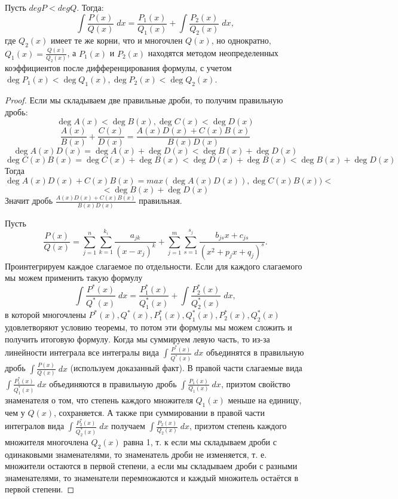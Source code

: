 	\begin{theorem}
		Пусть $deg P < deg Q$. Тогда:
		\[ \int \frac{P(x)}{Q(x)} \; dx = \frac{P_1(x)}{Q_1(x)} + \int \frac{P_2(x)}{Q_2(x)} \; dx,\]
		где $Q_2(x)$ имеет те же корни, что и многочлен $Q(x)$, но
		однократно, $Q_1(x) = \frac{Q(x)}{Q_2(x)}$, а $P_1(x)$ и $P_2(x)$ находятся методом неопределенных коэффициентов после дифференцирования формулы, с учетом $\deg{P_1(x)} < \deg{Q_1(x)}, \deg{P_2(x)} < \deg{Q_2(x)}$.
	\end{theorem}
	
	\begin{proof}
		Если мы складываем две правильные дроби, то получим правильную дробь:
		\[ \deg{A(x)} < \deg{B(x)}, \deg{C(x)} < \deg{D(x)} \]
		\[ \frac{A(x)}{B(x)} + \frac{C(x)}{D(x)} = \frac{A(x)D(x) + C(x)B(x)}{B(x)D(x)} \]
		\[ \deg{A(x)D(x)} = \deg{A(x)} + \deg{D(x)} < \deg{B(x)} + \deg{D(x)} \]
		\[ \deg{C(x)B(x)} = \deg{C(x)} + \deg{B(x)} < \deg{D(x)} + \deg{B(x)} < \deg{B(x)} + \deg{D(x)} \]
		Тогда
		\[ \deg{A(x)D(x) + C(x)B(x)} = max(\deg{A(x)D(x)}), \deg{C(x)B(x)}) < \]
		\[ < \deg{B(x)} + \deg{D(x)} \]
		Значит дробь $\frac{A(x)D(x) + C(x)B(x)}{B(x)D(x)}$ правильная.
		
		Пусть
		\[\frac{P(x)}{Q(x)} = \sum_{j = 1}^{n} \sum_{k = 1}^{k_i} \frac{a_{jk}}{(x - x_j)^k} + \sum_{j = 1}^{m} \sum_{s = 1}^{s_j} \frac{b_{js}x + c_{js}}{(x^2 + p_jx + q_j)^{s}}.\]
		Проинтегрируем каждое слагаемое по отдельности. Если для каждого слагаемого мы можем применить такую формулу
		\[ \int \frac{P^*(x)}{Q^*(x)} \; dx = \frac{P^*_1(x)}{Q^*_1(x)} + \int \frac{P^*_2(x)}{Q^*_2(x)} \; dx,\] в которой многочлены $P^*(x), Q^*(x), P^*_1(x), Q^*_1(x), P^*_2(x), Q^*_2(x)$ удовлетворяют условию теоремы, то потом эти формулы мы можем сложить и получить итоговую формулу. Когда мы суммируем левую часть, то из-за линейности интеграла все интегралы вида $\displaystyle\int \frac{P^*(x)}{Q^*(x)} \; dx$ объединятся в правильную дробь $\displaystyle\int \frac{P(x)}{Q(x)} \; dx$ (используем доказанный факт). В правой части слагаемые вида $\displaystyle\int \frac{P^*_1(x)}{Q^*_1(x)} \; dx$ объединяются в правильную дробь $\displaystyle\int \frac{P_1(x)}{Q_1(x)} \; dx$, приэтом свойство знаменателя о том, что степень каждого множителя $Q_1(x)$ меньше на единицу, чем у $Q(x)$, сохраняется. А также при суммировании в правой части интегралов вида $\displaystyle\int \frac{P^*_2(x)}{Q^*_2(x)} \; dx$ получаем $\displaystyle\int \frac{P_2(x)}{Q_2(x)} \; dx$, приэтом степень каждого множителя многочлена $Q_2(x)$ равна 1, т. к если мы складываем дроби с одинаковыми знаменателями, то знаменатель дроби не изменяется, т. е. множители остаются в первой степени, а если мы складываем дроби с разными знаменателями, то знаменатели перемножаются и каждый множитель остаётся в первой степени.
		

\end{proof}
